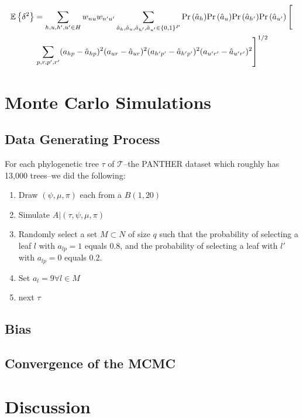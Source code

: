 \documentclass[12pt]{article}
\renewcommand{\Pr}[1]{{\mbox{Pr}\left(#1\right) }}
\newcommand{\Expected}[1]{{\mathbb{E}\left\{#1\right\}}}
\begin{document}
\begin{multline}
\Expected{\delta^2} = \sum_{h, u, h', u' \in H} w_{nu}w_{n'u'} %
\sum_{\hat a_h, \hat a_u, \hat a_{h'}, \hat a_{u'} \in \{0,1\}^P} %
\Pr{\hat a_h}\Pr{\hat a_u}\Pr{\hat a_{h'}}\Pr{\hat a_{u'}} \left[\vphantom{\sum_{p}}\right. \\
\left. \sum_{p,r,p',r'} %
(a_{hp} - \hat a_{hp})^2(a_{ur} - \hat a_{ur})^2(a_{h'p'} - \hat a_{h'p'})^2(a_{u'r'} - \hat a_{u'r'})^2\right]^{1/2}
\end{multline}

\section{Monte Carlo Simulations}

\subsection{Data Generating Process}

For each phylogenetic tree $\tau$ of $\mathcal{T}$--the PANTHER dataset which roughly has 13,000 trees--we did the following:

\begin{enumerate}
	\item Draw $(\psi, \mu, \pi)$ each from a $B(1, 20)$
	\item Simulate $A | (\tau, \psi, \mu, \pi)$
	\item Randomly select a set $M\subset N$ of size $q$ such that the probability of selecting a leaf $l$ with $a_{lp} = 1$ equals 0.8, and the probability of selecting a leaf with $l'$ with $a_{lp} = 0$ equals 0.2.
	\item Set $a_l = 9 \forall l \in M$
	\item next $\tau$
\end{enumerate}

\subsection{Bias}


\subsection{Convergence of the MCMC}

\section{Discussion}
\end{document}
